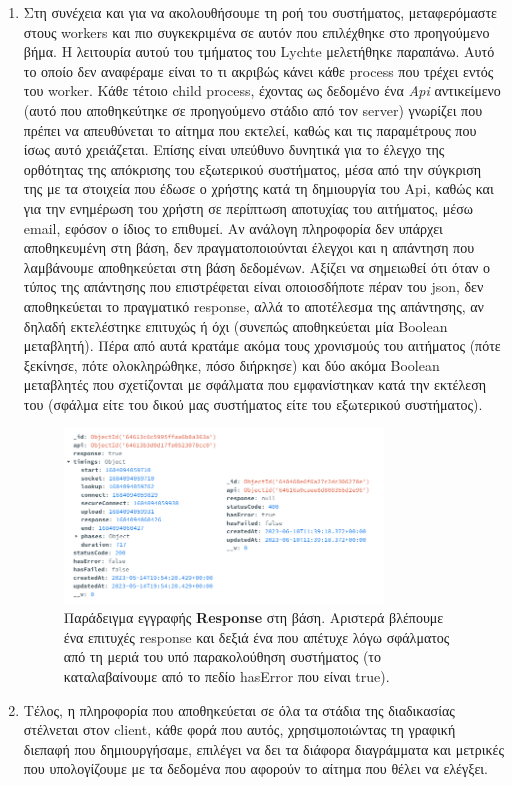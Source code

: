 \begin{enumerate}
	\item Στη συνέχεια και για να ακολουθήσουμε τη ροή του συστήματος, μεταφερόμαστε στους workers και πιο συγκεκριμένα σε αυτόν που επιλέχθηκε
		στο προηγούμενο βήμα. H λειτουρία αυτού του τμήματος του Lychte μελετήθηκε παραπάνω. Αυτό το οποίο δεν αναφέραμε είναι το τι ακριβώς κάνει κάθε process
		που τρέχει εντός του worker. Κάθε τέτοιο child process, έχοντας ως δεδομένο ένα \textit{Api} αντικείμενο (αυτό που αποθηκεύτηκε σε προηγούμενο στάδιο από τον server)
		γνωρίζει που πρέπει να απευθύνεται το αίτημα που εκτελεί, καθώς και τις παραμέτρους που ίσως αυτό χρειάζεται. Επίσης είναι υπεύθυνο δυνητικά για το έλεγχο της
		ορθότητας της απόκρισης του εξωτερικού συστήματος, μέσα από την σύγκριση της με τα στοιχεία που έδωσε ο χρήστης κατά τη δημιουργία του Api, καθώς και για την ενημέρωση του χρήστη
		σε περίπτωση αποτυχίας του αιτήματος, μέσω email, εφόσον ο ίδιος το επιθυμεί. Αν 
		ανάλογη πληροφορία δεν υπάρχει αποθηκευμένη στη βάση, δεν πραγματοποιούνται έλεγχοι και η απάντηση που λαμβάνουμε αποθηκεύεται στη βάση δεδομένων. Αξίζει να σημειωθεί
		ότι όταν ο τύπος της απάντησης που επιστρέφεται είναι οποιοσδήποτε πέραν του json, δεν αποθηκεύεται
		το πραγματικό response, αλλά το αποτέλεσμα της απάντησης, αν δηλαδή εκτελέστηκε επιτυχώς ή όχι (συνεπώς αποθηκεύεται μία Boolean μεταβλητή).
		Πέρα από αυτά κρατάμε ακόμα τους χρονισμούς του αιτήματος (πότε ξεκίνησε, πότε ολοκληρώθηκε, πόσο διήρκησε) και δύο ακόμα Boolean μεταβλητές που σχετίζονται με σφάλματα που εμφανίστηκαν
		κατά την εκτέλεση του (σφάλμα είτε του δικού μας συστήματος είτε του εξωτερικού συστήματος).  
		\begin{figure}[!ht]
			\centering
			\includegraphics[width=0.8\textwidth]{./images/chapter4/response_docs.png}
			\caption[Παράδειγμα εγγραφών \textbf{Response} στη βάση]{Παράδειγμα εγγραφής \textbf{Response} στη βάση. Αριστερά βλέπουμε ένα επιτυχές response και δεξιά ένα που απέτυχε λόγω σφάλματος από τη μεριά του υπό παρακολούθηση συστήματος (το καταλαβαίνουμε από το πεδίο hasError που είναι true).}
			\label{fig:response_docs}
		\end{figure}
	\item Τέλος, η πληροφορία που αποθηκεύεται σε όλα τα στάδια της διαδικασίας στέλνεται στον client, κάθε φορά που αυτός, χρησιμοποιώντας τη γραφική διεπαφή
		που δημιουργήσαμε, επιλέγει να δει τα διάφορα διαγράμματα και μετρικές που υπολογίζουμε με τα δεδομένα που αφορούν το αίτημα που θέλει να ελέγξει.
\end{enumerate}

